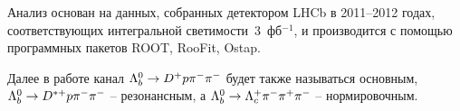 Анализ основан на данных, собранных детектором LHCb в 2011--2012 годах, 
соответствующих интегральной светимости~3~фб$^{-1}$, и производится 
с помощью программных пакетов ROOT, RooFit, Ostap.

Далее в работе канал $\Lb\to\Dp\p\pim\pim$ будет также называться 
основным, $\Lb\to\Dstarp\p\pim\pim$ -- резонансным, 
а $\Lb\to\Lc\pim\pip\pim$ -- нормировочным.

